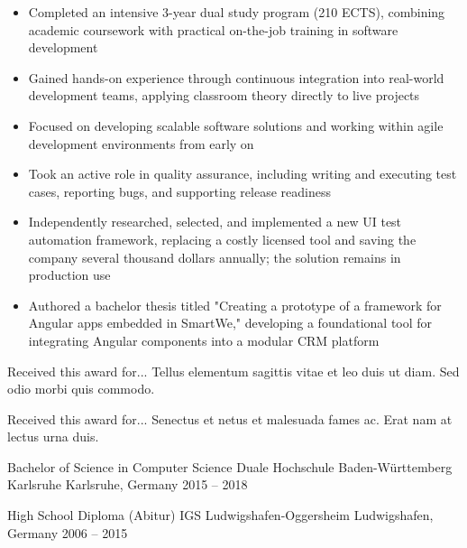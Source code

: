 \documentclass[10pt, a4paper]{cvhari}
\begin{document}
    \vspace{0.2em}
    \begin{itemize}
        \item Completed an intensive 3-year dual study program (210 ECTS), combining academic coursework with practical on-the-job training in software development

        \item Gained hands-on experience through continuous integration into real-world development teams, applying classroom theory directly to live projects

        \item Focused on developing scalable software solutions and working within agile development environments from early on

        \item Took an active role in quality assurance, including writing and executing test cases, reporting bugs, and supporting release readiness

        \item Independently researched, selected, and implemented a new UI test automation framework, replacing a costly licensed tool and saving the company several thousand dollars annually; the solution remains in production use

        \item Authored a bachelor thesis titled "Creating a prototype of a framework for Angular apps embedded in SmartWe," developing a foundational tool for integrating Angular components into a modular CRM platform
    \end{itemize}



\medskip

    \bigskip
    
    {Received this award for... Tellus elementum sagittis vitae et leo duis ut diam. Sed odio morbi quis commodo.}\par
    
    \smallskip 
    \dividergray
    \smallskip
    
    {Received this award for... Senectus et netus et malesuada fames ac. Erat nam at lectus urna duis.}\par
    \medskip

\medskip


\medskip
    \education
        {Bachelor of Science in Computer Science}
        {Duale Hochschule Baden-Württemberg Karlsruhe} 
        {Karlsruhe, Germany}
        {2015 -- 2018}
        \par
        \dividergray
     
        \education
        {High School Diploma (Abitur)}
        {IGS Ludwigshafen-Oggersheim}
        {Ludwigshafen, Germany}
        {2006 -- 2015}

        \par
        \dividergray
\end{document}
